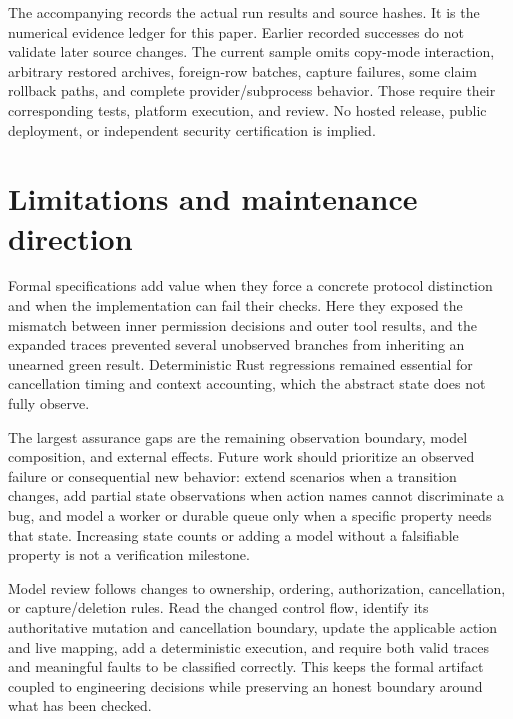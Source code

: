 \documentclass[10pt,letterpaper]{article}
\begin{document}
The accompanying  records the actual
run results and source hashes. It is the numerical evidence ledger for this
paper. Earlier recorded successes do not validate later source changes. The
current sample omits copy-mode interaction, arbitrary restored archives,
foreign-row batches, capture failures, some claim rollback paths, and complete
provider/subprocess behavior. Those require their corresponding tests,
platform execution, and review. No hosted release, public deployment, or
independent security certification is implied.

\section{Limitations and maintenance direction}
Formal specifications add value when they force a concrete protocol distinction
and when the implementation can fail their checks. Here they exposed the
mismatch between inner permission decisions and outer tool results, and the
expanded traces prevented several unobserved branches from inheriting an
unearned green result. Deterministic Rust regressions remained essential for
cancellation timing and context accounting, which the abstract state does not
fully observe.

The largest assurance gaps are the remaining observation boundary, model
composition, and external effects. Future work should prioritize an observed
failure or consequential new behavior: extend scenarios when a transition
changes, add partial state observations when action names cannot discriminate
a bug, and model a worker or durable queue only when a specific property needs
that state. Increasing state counts or adding a model without a falsifiable
property is not a verification milestone.

Model review follows changes to ownership, ordering, authorization,
cancellation, or capture/deletion rules. Read the changed control flow,
identify its authoritative mutation and cancellation boundary, update the
applicable action and live mapping, add a deterministic execution, and require
both valid traces and meaningful faults to be classified correctly. This
keeps the formal artifact coupled to engineering decisions while preserving an
honest boundary around what has been checked.

\clearpage


\end{document}
